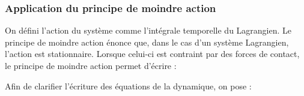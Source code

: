 			\subsubsection{Application du principe de moindre action}	
			
				
					On défini l'action du système comme l'intégrale temporelle du Lagrangien. 
					Le principe de moindre action énonce que, dans le cas d'un système Lagrangien, l'action est stationnaire.
					Lorsque celui-ci est contraint par des forces de contact, le principe de moindre action permet d'écrire :
					
					Afin de clarifier l'écriture des équations de la dynamique, on pose :
				
				
